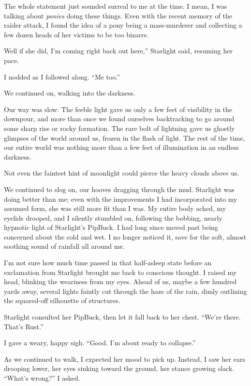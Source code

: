 The whole statement just sounded surreal to me at the time. I mean, I was talking about \textit{ponies} doing these things. Even with the recent memory of the raider attack, I found the idea of a pony being a mass-murderer and collecting a few dozen heads of her victims to be too bizarre.

\leavevmode{}Well if she did, I’m coming right back out here,” Starlight said, resuming her pace.

I nodded as I followed along. “Me too.”

We continued on, walking into the darkness.

{\br}%
Our way was slow. The feeble light gave us only a few feet of visibility in the downpour, and more than once we found ourselves backtracking to go around some sharp rise or rocky formation. The rare bolt of lightning gave us ghostly glimpses of the world around us, frozen in the flash of light. The rest of the time, our entire world was nothing more than a few feet of illumination in an endless darkness.

Not even the faintest hint of moonlight could pierce the heavy clouds above us.

We continued to slog on, our hooves dragging through the mud. Starlight was doing better than me; even with the improvements I had incorporated into my assumed form, she was still more fit than I was. My entire body ached, my eyelids drooped, and I silently stumbled on, following the bobbing, nearly hypnotic light of Starlight’s PipBuck. I had long since moved past being concerned about the cold and wet. I no longer noticed it, save for the soft, almost soothing sound of rainfall all around me.

I’m not sure how much time passed in that half-asleep state before an exclamation from Starlight brought me back to conscious thought. I raised my head, blinking the weariness from my eyes. Ahead of us, maybe a few hundred yards away, several lights faintly cut through the haze of the rain, dimly outlining the squared-off silhouette of structures.

Starlight consulted her PipBuck, then let it fall back to her chest. “We’re there. That’s Rust.”

I gave a weary, happy sigh. “Good. I’m about ready to collapse.”

As we continued to walk, I expected her mood to pick up. Instead, I saw her ears drooping lower, her eyes sinking toward the ground, her stance growing slack. “What’s wrong?” I asked.

